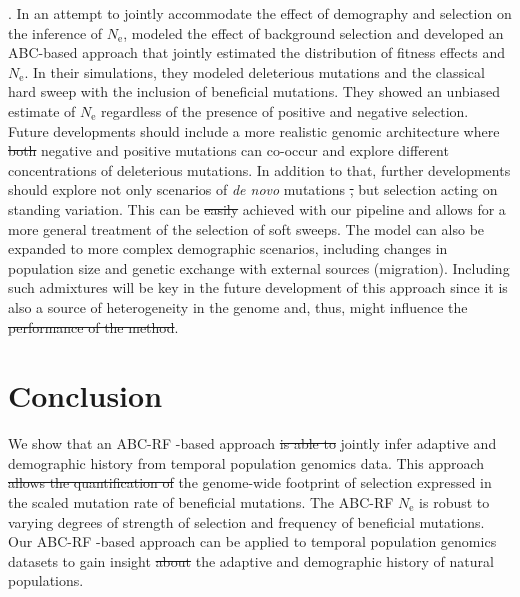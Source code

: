 \documentclass[a4paper, 12pt]{article}
\providecommand{\DIFaddtex}[1]{{\protect\color{blue}\uwave{#1}}} %
\providecommand{\DIFdeltex}[1]{{\protect\color{red}\sout{#1}}}                      %
\providecommand{\DIFaddbegin}{} %
\providecommand{\DIFaddend}{} %
\providecommand{\DIFdelbegin}{} %
\providecommand{\DIFdelend}{} %
\providecommand{\DIFadd}[1]{\texorpdfstring{\DIFaddtex{#1}}{#1}} %
\providecommand{\DIFdel}[1]{\texorpdfstring{\DIFdeltex{#1}}{}} %
\newcommand{\DIFscaledelfig}{0.5}
\newlength{\DIFdelgraphicswidth} %
\newlength{\DIFdelgraphicsheight} %
\newcommand{\DIFaddincludegraphics}[2][]{{\color{blue}\fbox{\DIFOincludegraphics[#1]{#2}}}} %
\newcommand{\DIFdelincludegraphics}[2][]{%
\sbox{\DIFdelgraphicsbox}{\DIFOincludegraphics[#1]{#2}}%
\settoboxwidth{\DIFdelgraphicswidth}{\DIFdelgraphicsbox} %
\settoboxtotalheight{\DIFdelgraphicsheight}{\DIFdelgraphicsbox} %
\scalebox{\DIFscaledelfig}{%
\parbox[b]{\DIFdelgraphicswidth}{\usebox{\DIFdelgraphicsbox}\\[-\baselineskip] \rule{\DIFdelgraphicswidth}{0em}}\llap{\resizebox{\DIFdelgraphicswidth}{\DIFdelgraphicsheight}{%
\setlength{\unitlength}{\DIFdelgraphicswidth}%
\begin{picture}(1,1)%
\thicklines\linethickness{2pt} %
{\color[rgb]{1,0,0}\put(0,0){\framebox(1,1){}}}%
{\color[rgb]{1,0,0}\put(0,0){\line( 1,1){1}}}%
{\color[rgb]{1,0,0}\put(0,1){\line(1,-1){1}}}%
\end{picture}%
}\hspace*{3pt}}} %
} %
\DeclareRobustCommand{\DIFaddbegin}{\DIFOaddbegin \let\includegraphics\DIFaddincludegraphics} %
\DeclareRobustCommand{\DIFaddend}{\DIFOaddend \let\includegraphics\DIFOincludegraphics} %
\DeclareRobustCommand{\DIFdelbegin}{\DIFOdelbegin \let\includegraphics\DIFdelincludegraphics} %
\DeclareRobustCommand{\DIFdelend}{\DIFOaddend \let\includegraphics\DIFOincludegraphics} %
\begin{document}
{}\DIFaddend . In an attempt to jointly accommodate the effect of demography and selection on the inference of $N_{\mathrm{e}}$,  \citet{Johri:2020ee} modeled the effect of background selection and developed an ABC-based approach that jointly estimated the distribution of fitness effects and $N_{\mathrm{e}}$. In their simulations, they modeled deleterious mutations and the classical hard sweep with the inclusion of beneficial mutations. They showed an unbiased estimate of $N_{\mathrm{e}}$ regardless of the presence of positive and negative selection. Future developments should include a more realistic genomic architecture where \DIFdelbegin \DIFdel{both }\DIFdelend negative and positive mutations can co-occur and explore different concentrations of deleterious mutations. In addition to that, further developments should explore not only scenarios of \textit{de novo} mutations \DIFdelbegin \DIFdel{, }\DIFdelend but selection acting on standing variation. This can be \DIFdelbegin \DIFdel{easily }\DIFdelend achieved with our pipeline and allows for a more general treatment of the selection of soft sweeps. The model can also be expanded to more complex demographic scenarios, including changes in population size and genetic exchange with external sources (migration). Including such admixtures will be key in the future development of this approach since it is also a source of heterogeneity in the genome and, thus, might influence the \DIFdelbegin \DIFdel{performance of the method}\DIFdelend \DIFaddbegin \DIFadd{method's performance}\DIFaddend . 

\section*{Conclusion}

We show that an ABC-RF -based approach \DIFdelbegin \DIFdel{is able to }\DIFdelend \DIFaddbegin \DIFadd{can }\DIFaddend jointly infer adaptive and demographic history from temporal population genomics data. This approach \DIFdelbegin \DIFdel{allows the quantification of }\DIFdelend \DIFaddbegin \DIFadd{quantifies }\DIFaddend the genome-wide footprint of selection expressed in the scaled mutation rate of beneficial mutations. The ABC-RF $N_{\mathrm{e}}$ is robust to varying degrees of strength of selection and frequency of beneficial mutations. Our ABC-RF -based approach can be applied to temporal population genomics datasets to gain insight \DIFdelbegin \DIFdel{about }\DIFdelend \DIFaddbegin \DIFadd{into }\DIFaddend the adaptive and demographic history of natural populations.
\end{document}
